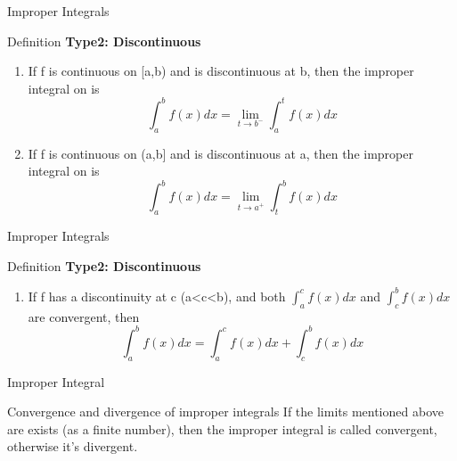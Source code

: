 \begin{frame}{Improper Integrals}
    \begin{block}{Definition}
        \textbf{Type2: Discontinuous}
        \begin{enumerate}


            \item If f is continuous on [a,b) and is discontinuous at b, then the improper integral on is
                  \begin{equation*}
                      \int_a^{b} f(x)dx = \lim_{t\rightarrow b^-}\int_{a}^{t}f(x)dx
                  \end{equation*}

            \item
                  If f is continuous on (a,b] and is discontinuous at a, then the improper integral on is
                  \begin{equation*}
                      \int_a^{b} f(x)dx = \lim_{t\rightarrow a^+}\int_{t}^{b}f(x)dx
                  \end{equation*}



        \end{enumerate}

    \end{block}
\end{frame}

\begin{frame}{Improper Integrals}
    \begin{block}{Definition}
        \textbf{Type2: Discontinuous}
        \begin{enumerate}[3]

            \item
                  If f has a discontinuity at c (a<c<b), and both $\int_{a}^{c}f(x)dx$ and  $\int_{c}^{b}f(x)dx$ are convergent, then
                  \begin{equation*}
                      \int_a^{b} f(x)dx = \int_{a}^{c}f(x)dx + \int_{c}^{b}f(x)dx
                  \end{equation*}

        \end{enumerate}

    \end{block}
\end{frame}



\begin{frame}{Improper Integral}
    \begin{block}{Convergence and divergence of improper integrals}
        If the limits mentioned above are exists (as a finite number), then the improper integral is called convergent, otherwise it's divergent.
    \end{block}
\end{frame}

